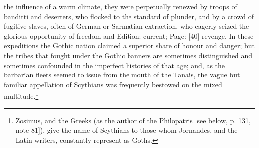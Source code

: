 the influence of a warm climate, they were perpetually renewed by troops of banditti and deserters, who flocked to the standard of plunder, and by a crowd of fugitive slaves, often of German or Sarmatian extraction, who eagerly seized the glorious opportunity of freedom and Edition: current; Page: [40] revenge. In these expeditions the Gothic nation claimed a superior share of honour and danger; but the tribes that fought under the Gothic banners are sometimes distinguished and sometimes confounded in the imperfect histories of that age; and, as the barbarian fleets seemed to issue from the mouth of the Tanais, the vague but familiar appellation of Scythians was frequently bestowed on the mixed multitude.\footnote{Zosimus, and the Greeks (as the author of the Philopatris [see below, p. 131, note 81]), give the name of Scythians to those whom Jornandes, and the Latin writers, constantly represent as Goths.}

